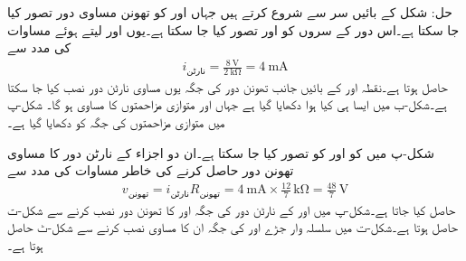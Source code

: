 حل: شکل  کے بائیں سر سے شروع کرتے ہیں جہاں  اور  کو تھونن مساوی دور تصور کیا جا سکتا ہے۔اس دور کے سروں کو  اور  تصور کیا جا سکتا ہے۔یوں  اور  لیتے ہوئے مساوات  کی مدد سے 
\begin{align*}
i_{\text{نارٹن}}=\frac{\SI{8}{\volt}}{\SI{2}{\kilo\ohm}}=\SI{4}{\milli\ampere}
\end{align*}
حاصل ہوتا ہے۔نقطہ  اور  کے بائیں جانب تھونن دور کی جگہ یوں مساوی نارٹن دور نصب کیا جا سکتا ہے۔شکل-ب میں ایسا ہی کیا ہوا دکھایا گیا ہے جہاں  اور  متوازی مزاحمتوں کا مساوی  ہو گا۔ شکل-پ میں متوازی مزاحمتوں کی جگہ  کو دکھایا گیا ہے۔

شکل-پ میں  کو  اور  کو  تصور کیا جا سکتا ہے۔ان دو اجزاء کے نارٹن دور کا مساوی تھونن دور حاصل کرنے کی خاطر مساوات  کی مدد سے 
\begin{align*}
v_{\text{تھونن}}=i_{\text{نارٹن}} R_{\text{تھونن}}=\SI{4}{\milli\ampere} \times \frac{12}{7} \, \si{\kilo\ohm}=\frac{48}{7} \, \si{\volt}
\end{align*}
حاصل کیا جاتا ہے۔شکل-پ میں   اور   کے نارٹن دور کی جگہ  اور  کا تھونن دور نصب کرنے سے شکل-ت حاصل ہوتا ہے۔شکل-ت میں سلسلہ وار جڑے  اور  کی جگہ ان کا مساوی  نصب کرنے سے شکل-ٹ حاصل ہوتا ہے۔

